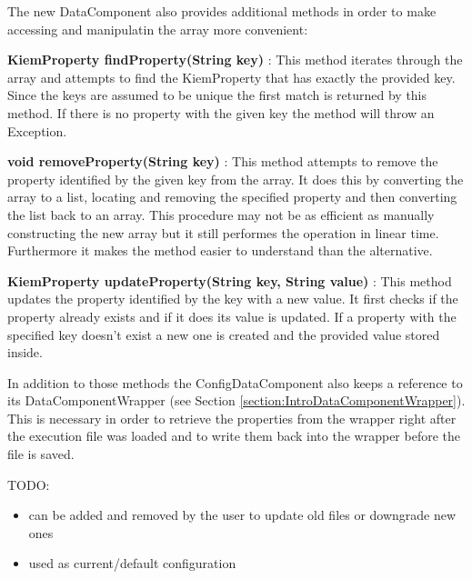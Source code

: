 The new DataComponent also provides additional methods in order to make accessing and manipulatin the
array more convenient:
\begin{description}
 \item \textbf{KiemProperty findProperty(String key)} : This method iterates through the array and attempts
to find the KiemProperty that has exactly the provided key. Since the keys are assumed to be unique the first
match is returned by this method. If there is no property with the given key the method will throw
an Exception.
 \item \textbf{void removeProperty(String key)} : This method attempts to remove the property identified by
the given key from the array. It does this by converting the array to a list, locating and removing the
specified property and then converting the list back to an array. This procedure may not be as efficient
as manually constructing the new array but it still performes the operation in linear time. Furthermore
it makes the method easier to understand than the alternative.
 \item \textbf{KiemProperty updateProperty(String key, String value)} : This method updates the property 
identified by the key with a new value. It first checks if the property already exists and if it does its value
is updated. If a property with the specified key doesn't exist a new one is created and the provided value
stored inside.
\end{description}

In addition to those methods the ConfigDataComponent also keeps a reference to its DataComponentWrapper (see Section
\ref{section:IntroDataComponentWrapper}). This is necessary in order to retrieve the properties from the wrapper
right after the execution file was loaded and to write them back into the wrapper before the file is saved.

TODO:
\begin{itemize}
 \item can be added and removed by the user to update old files or downgrade new ones
 \item used as current/default configuration
\end{itemize}

